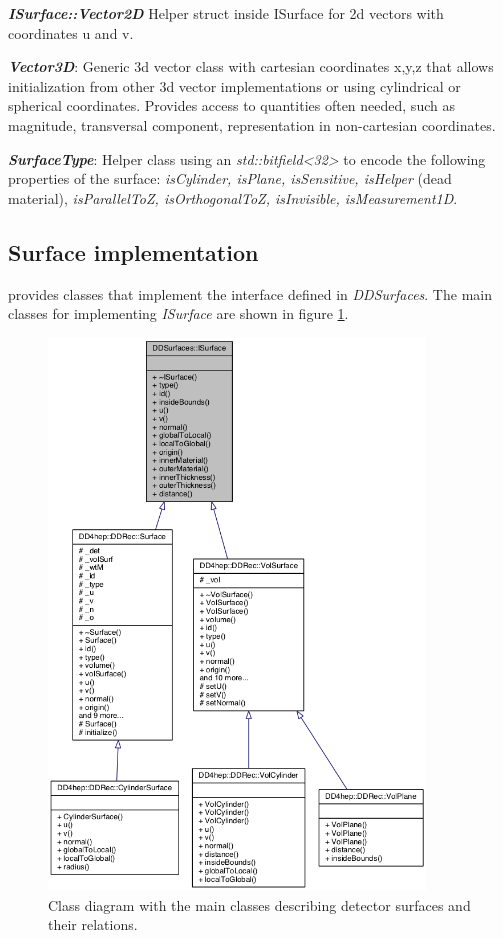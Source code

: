 \documentclass[10pt,a4paper]{article}
\begin{document}
\noindent
{\em \bf ISurface::Vector2D} Helper struct inside ISurface for 2d vectors with coordinates u and v.

\noindent
{\em \bf Vector3D}: Generic 3d vector class with cartesian coordinates x,y,z that allows initialization
from other 3d vector implementations or using cylindrical or spherical coordinates. Provides access to
quantities often needed, such as magnitude, transversal component, representation in non-cartesian
coordinates.

\noindent
{\em \bf SurfaceType}: Helper class using an {\em std::bitfield<32>} to encode the 
following properties of the surface: {\em isCylinder, isPlane, isSensitive, isHelper} (dead material),
{\em isParallelToZ, isOrthogonalToZ, isInvisible, isMeasurement1D}.

\subsection{Surface implementation}
\label{subsec:ddrec-ddsurfaces}
\DDR provides classes that implement the interface defined in {\em DDSurfaces}.
The main classes for implementing {\em ISurface} are shown in 
figure \ref{fig:ddrec_surfaces_classes}.

\begin{figure}[h]
  \begin{center}
    \includegraphics[width=100mm] {DDRec_surface_classes}
    \caption{Class diagram with the main classes describing detector
      surfaces and their relations.}
    \label{fig:ddrec_surfaces_classes}
  \end{center}
\end{figure}
\end{document}
